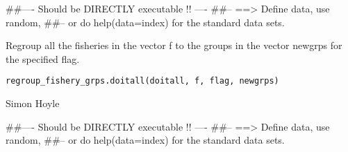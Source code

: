 \documentclass[a4paper]{book}
\begin{document}
%
\begin{Examples}
\begin{ExampleCode}
##---- Should be DIRECTLY executable !! ----
##-- ==>  Define data, use random,
##--	or do  help(data=index)  for the standard data sets.

\end{ExampleCode}
\end{Examples}
%
\begin{Description}\relax

Regroup all the fisheries in the vector f to the groups in the vector newgrps for the specified flag. 
\end{Description}
%
\begin{Usage}
\begin{verbatim}
regroup_fishery_grps.doitall(doitall, f, flag, newgrps)
\end{verbatim}
\end{Usage}
%
\begin{Arguments}
\begin{ldescription}
\item[\code{doitall}] 


\item[\code{f}] 


\item[\code{flag}] 


\item[\code{newgrps}] 


\end{ldescription}
\end{Arguments}
%
\begin{Author}\relax

Simon Hoyle
\end{Author}
%
\begin{Examples}
\begin{ExampleCode}
##---- Should be DIRECTLY executable !! ----
##-- ==>  Define data, use random,
##--	or do  help(data=index)  for the standard data sets.

\end{ExampleCode}
\end{Examples}
\end{document}
